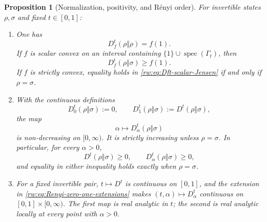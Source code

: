 \documentclass[11pt]{article}
\newtheorem{proposition}[proposition]{Proposition}
\theoremstyle{remark}
\newcommand{\1}{\mathbbm{1}}
\begin{document}
\begin{proposition}[Normalization, positivity, and R\'enyi order]
\label{rw:prop:basic-spectral-properties}
For invertible states $\rho,
\sigma$ and fixed $t\in[0,1]$:
\begin{enumerate}[label=\textnormal{(\roman*)}]
\item One has
\begin{equation}
 D_f^t(\rho\Vert\rho)=f(1).
 \label{rw:eq:Dft-diagonal-normalization}
\end{equation}
If $f$ is scalar convex on an interval containing
$\{1\}\cup\operatorname{spec}(\Gamma_t)$, then
\begin{equation}
 D_f^t(\rho\Vert\sigma)\geq f(1).
 \label{rw:eq:Dft-scalar-Jensen}
\end{equation}
If $f$ is strictly convex, equality holds in
\eqref{rw:eq:Dft-scalar-Jensen} if and only if $\rho=\sigma$.

\item With the continuous definitions
\begin{equation}
 D_0^t(\rho\Vert\sigma):=0,
 \qquad
 D_1^t(\rho\Vert\sigma):=D^t(\rho\Vert\sigma),
 \label{rw:eq:Renyi-zero-one-extensions}
\end{equation}
the map
\begin{equation}
 \alpha\longmapsto D_\alpha^t(\rho\Vert\sigma)
 \label{rw:eq:Renyi-order-map}
\end{equation}
is non-decreasing on $[0,\infty)$.  It is strictly increasing unless
$\rho=\sigma$.  In particular, for every $\alpha>0$,
\begin{equation}
 D^t(\rho\Vert\sigma)\geq0,
 \qquad
 D_\alpha^t(\rho\Vert\sigma)\geq0,
 \label{rw:eq:basic-nonnegativity}
\end{equation}
and equality in either inequality holds exactly when $\rho=\sigma$.

\item For a fixed invertible pair, $t\mapsto D^t$ is continuous on
$[0,1]$, and the extension in
\eqref{rw:eq:Renyi-zero-one-extensions} makes
$(t,\alpha)\mapsto D_\alpha^t$ continuous on
$[0,1]\times[0,\infty)$.  The first map is real analytic in $t$;
the second is real analytic locally at every point with $\alpha>0$.
\end{enumerate}
\end{proposition}
\end{document}
